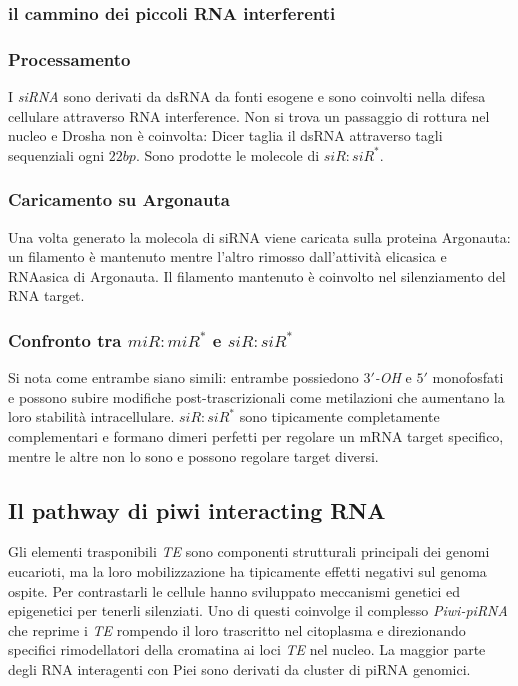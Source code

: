 \subsubsection{il cammino dei piccoli RNA interferenti}
\subsubsection{Processamento}
I \emph{siRNA} sono derivati da dsRNA da fonti esogene e sono coinvolti nella difesa cellulare attraverso RNA interference. Non si trova un passaggio di rottura nel nucleo e Drosha non
\`e coinvolta: Dicer taglia il dsRNA attraverso tagli sequenziali ogni $22bp$. Sono prodotte le molecole di \emph{$siR:siR^*$}. 
\subsubsection{Caricamento su Argonauta}
Una volta generato la molecola di siRNA viene caricata sulla proteina Argonauta: un filamento \`e mantenuto mentre l'altro rimosso dall'attivit\`a elicasica e RNAasica di Argonauta. Il
filamento mantenuto \`e coinvolto nel silenziamento del RNA target. 
\subsubsection{Confronto tra \emph{$miR:miR^*$} e \emph{$siR:siR^*$}}
Si nota come entrambe siano simili: entrambe possiedono \emph{$3'$-OH} e $5'$ monofosfati e possono subire modifiche post-trascrizionali come metilazioni che aumentano la loro 
stabilit\`a intracellulare. \emph{$siR:siR^*$} sono tipicamente completamente complementari e formano dimeri perfetti per regolare un mRNA target specifico, mentre le altre non lo
sono e possono regolare target diversi. 
\subsection{Il pathway di piwi interacting RNA}
Gli elementi trasponibili \emph{TE} sono componenti strutturali principali dei genomi eucarioti, ma la loro mobilizzazione ha tipicamente effetti negativi sul genoma ospite. Per
contrastarli le cellule hanno sviluppato meccanismi genetici ed epigenetici per tenerli silenziati. Uno di questi coinvolge il complesso \emph{Piwi-piRNA} che reprime i \emph{TE}
rompendo il loro trascritto nel citoplasma e direzionando specifici rimodellatori della cromatina ai loci \emph{TE} nel nucleo. La maggior parte degli RNA interagenti con Piei
sono derivati da cluster di piRNA genomici. 
